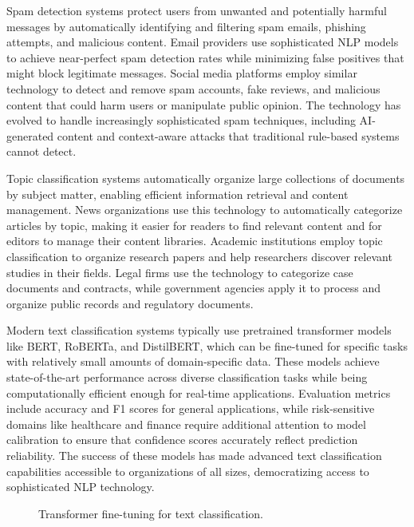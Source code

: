 Spam detection systems protect users from unwanted and potentially harmful messages by automatically identifying and filtering spam emails, phishing attempts, and malicious content. Email providers use sophisticated NLP models to achieve near-perfect spam detection rates while minimizing false positives that might block legitimate messages. Social media platforms employ similar technology to detect and remove spam accounts, fake reviews, and malicious content that could harm users or manipulate public opinion. The technology has evolved to handle increasingly sophisticated spam techniques, including AI-generated content and context-aware attacks that traditional rule-based systems cannot detect.

Topic classification systems automatically organize large collections of documents by subject matter, enabling efficient information retrieval and content management. News organizations use this technology to automatically categorize articles by topic, making it easier for readers to find relevant content and for editors to manage their content libraries. Academic institutions employ topic classification to organize research papers and help researchers discover relevant studies in their fields. Legal firms use the technology to categorize case documents and contracts, while government agencies apply it to process and organize public records and regulatory documents.

Modern text classification systems typically use pretrained transformer models like BERT, RoBERTa, and DistilBERT, which can be fine-tuned for specific tasks with relatively small amounts of domain-specific data. These models achieve state-of-the-art performance across diverse classification tasks while being computationally efficient enough for real-time applications. Evaluation metrics include accuracy and F1 scores for general applications, while risk-sensitive domains like healthcare and finance require additional attention to model calibration to ensure that confidence scores accurately reflect prediction reliability. The success of these models has made advanced text classification capabilities accessible to organizations of all sizes, democratizing access to sophisticated NLP technology.

\begin{figure}[h]
  \centering
  \caption{Transformer fine-tuning for text classification.}
  \label{fig:nlp-class}
\end{figure}

